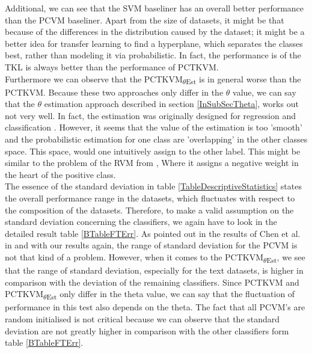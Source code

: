 Additional, we can see that the \acs{SVM} baseliner has an overall better performance than the \acs{PCVM} baseliner.
Apart from the size of datasets, it might be that because of the differences in the distribution caused by the dataset; it might be a better idea for transfer learning to find a hyperplane, which separates the classes best, rather than modeling it via probabilistic.
In fact, the performance is of the \acs{TKL} is always better than the performance of \acs{PCTKVM}.\\
Furthermore we can observe that the \acs{PCTKVM}\textsubscript{$\theta$Est} is in general worse than the \acs{PCTKVM}. 
Because these two approaches only differ in the $\theta$ value, we can say that the $\theta$ estimation approach described in section \ref{InSubSecTheta}, works out not very well.
In fact, the estimation was originally designed for regression and classification \cite{Kitayama.2011}. However, it seems that the value of the estimation is too 'smooth' and the probabilistic estimation for one class are 'overlapping' in the other classes space.
This space, would one intuitively assign to the other label.
This might be similar to the problem of the \acs{RVM} from \cite{Chen.2009}, Where it assigns a negative weight in the heart of the positive class.\\
The essence of the standard deviation in table \ref{TableDescriptiveStatistics} states the overall performance range in the datasets, which fluctuates with respect to the composition of the datasets.
Therefore, to make a valid assumption on the standard deviation concerning the classifiers, we again have to look in the detailed result table \ref{BTableFTErr}.
As pointed out in the results of Chen et al. in \cite{Chen.2009} and with our results again, the range of standard deviation for the \acs{PCVM} is not that kind of a problem. 
However, when it comes to the \acs{PCTKVM}\textsubscript{$\theta$Est}, we see that the range of standard deviation, especially for the text datasets, is higher in comparison with the deviation of the remaining classifiers.
Since \acs{PCTKVM} and \acs{PCTKVM}\textsubscript{$\theta$Est} only differ in the theta value, we can say that the fluctuation of performance in this test also depends on the theta.
The fact that all \acs{PCVM}'s are random initialised is not critical because we can observe that the standard deviation are not greatly higher in comparison with the other classifiers form table \ref{BTableFTErr}. 

